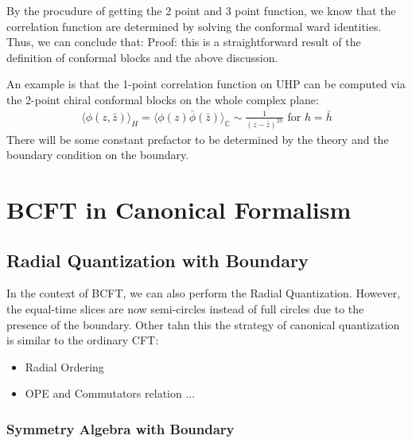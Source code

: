 By the procudure of getting the 2 point and 3 point function, we know
that the correlation function are determined by solving the conformal
ward identities. Thus, we can conclude that:
Proof: this is a straightforward result of the definition of
conformal blocks and the above discussion.

An example is that the 1-point correlation function on UHP can be
computed via the 2-point chiral conformal blocks on the whole complex plane:
\begin{align}
  \langle \phi(z,\bar{z}) \rangle_{H} = \langle \phi(z)
  \bar{\phi}(\bar{z}) \rangle_{\mathbb{C}} \sim \frac{1}{(z -
  \bar{z})^{2h}} \text{ for } h = \bar{h}
\end{align}
There will be some constant prefactor to be determined by the theory
and the boundary condition on the boundary.

\newpage
\section{BCFT in Canonical Formalism}

\subsection{Radial Quantization with Boundary}

In the context of BCFT, we can also perform the Radial Quantization.
However, the equal-time slices are now semi-circles instead of full
circles due to the presence of the boundary. Other tahn this the
strategy of canonical quantization is similar to the ordinary CFT:
\begin{itemize}
  \item Radial Ordering
  \item OPE and Commutators relation
    ...
\end{itemize}

\subsubsection{Symmetry Algebra with Boundary}

